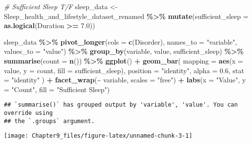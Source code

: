 \documentclass[
  11pt,
]{article}
\newenvironment{Shaded}{\begin{snugshade}}{\end{snugshade}}
\newcommand{\AttributeTok}[1]{\textcolor[rgb]{0.13,0.29,0.53}{#1}}
\newcommand{\CommentTok}[1]{\textcolor[rgb]{0.56,0.35,0.01}{\textit{#1}}}
\newcommand{\FloatTok}[1]{\textcolor[rgb]{0.00,0.00,0.81}{#1}}
\newcommand{\FunctionTok}[1]{\textcolor[rgb]{0.13,0.29,0.53}{\textbf{#1}}}
\newcommand{\NormalTok}[1]{#1}
\newcommand{\OtherTok}[1]{\textcolor[rgb]{0.56,0.35,0.01}{#1}}
\newcommand{\SpecialCharTok}[1]{\textcolor[rgb]{0.81,0.36,0.00}{\textbf{#1}}}
\newcommand{\StringTok}[1]{\textcolor[rgb]{0.31,0.60,0.02}{#1}}
\begin{document}
\begin{Shaded}
\begin{Highlighting}[]
\CommentTok{\# Sufficient Sleep T/F}
\NormalTok{sleep\_data }\OtherTok{\textless{}{-}}\NormalTok{ Sleep\_health\_and\_lifestyle\_dataset\_renamed }\SpecialCharTok{\%\textgreater{}\%}
    \FunctionTok{mutate}\NormalTok{(}\AttributeTok{sufficient\_sleep =} \FunctionTok{as.logical}\NormalTok{(Duration }\SpecialCharTok{\textgreater{}=} \FloatTok{7.0}\NormalTok{))}

\NormalTok{sleep\_data }\SpecialCharTok{\%\textgreater{}\%}
  \FunctionTok{pivot\_longer}\NormalTok{(}\AttributeTok{cols =} \FunctionTok{c}\NormalTok{(Disorder), }\AttributeTok{names\_to =} \StringTok{"variable"}\NormalTok{, }\AttributeTok{values\_to =} \StringTok{"value"}\NormalTok{) }\SpecialCharTok{\%\textgreater{}\%}
  \FunctionTok{group\_by}\NormalTok{(variable, value, sufficient\_sleep) }\SpecialCharTok{\%\textgreater{}\%}
  \FunctionTok{summarise}\NormalTok{(}\AttributeTok{count =} \FunctionTok{n}\NormalTok{()) }\SpecialCharTok{\%\textgreater{}\%}
  \FunctionTok{ggplot}\NormalTok{() }\SpecialCharTok{+}
  \FunctionTok{geom\_bar}\NormalTok{(}
    \AttributeTok{mapping =} \FunctionTok{aes}\NormalTok{(}\AttributeTok{x =}\NormalTok{ value, }\AttributeTok{y =}\NormalTok{ count, }\AttributeTok{fill =}\NormalTok{ sufficient\_sleep),}
    \AttributeTok{position =} \StringTok{"identity"}\NormalTok{,}
    \AttributeTok{alpha =} \FloatTok{0.6}\NormalTok{,}
    \AttributeTok{stat =} \StringTok{"identity"}
\NormalTok{  ) }\SpecialCharTok{+}
  \FunctionTok{facet\_wrap}\NormalTok{(}\SpecialCharTok{\textasciitilde{}}\NormalTok{ variable, }\AttributeTok{scales =} \StringTok{"free"}\NormalTok{) }\SpecialCharTok{+}
  \FunctionTok{labs}\NormalTok{(}\AttributeTok{x =} \StringTok{"Value"}\NormalTok{, }\AttributeTok{y =} \StringTok{"Count"}\NormalTok{, }\AttributeTok{fill =} \StringTok{"Sufficient Sleep"}\NormalTok{)}
\end{Highlighting}
\end{Shaded}

\begin{verbatim}
## `summarise()` has grouped output by 'variable', 'value'. You can override using
## the `.groups` argument.
\end{verbatim}

\begin{center}\texttt{[image: Chapter9\_files/figure-latex/unnamed-chunk-3-1]} \end{center}
\end{document}
